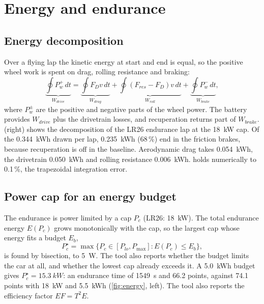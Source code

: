 \documentclass[11pt]{article}
\begin{document}
\section{Energy and endurance}\label{sec:energy}
\subsection{Energy decomposition}
Over a flying lap the kinetic energy at start and end is equal, so the positive wheel work is spent on drag,
rolling resistance and braking:
\begin{equation}
\underbrace{\oint P_w^+\,dt}_{W_{drive}} = \underbrace{\oint F_D v\,dt}_{W_{drag}} + \underbrace{\oint (F_{res}-F_D) v\,dt}_{W_{roll}} + \underbrace{\oint P_w^-\,dt}_{W_{brake}},
\label{eq:balance}
\end{equation}
where $P_w^\pm$ are the positive and negative parts of the wheel power. The battery provides $W_{drive}$ plus the
drivetrain losses, and recuperation returns part of $W_{brake}$.  (right) shows the decomposition
of the LR26 endurance lap at the \SI{18}{kW} cap. Of the \SI{0.344}{kWh} drawn per lap, \SI{0.235}{kWh} (68\,\%)
end in the friction brakes, because recuperation is off in the baseline. Aerodynamic drag takes
\SI{0.054}{kWh}, the drivetrain \SI{0.050}{kWh} and rolling resistance \SI{0.006}{kWh}.  holds
numerically to 0.1\,\%, the trapezoidal integration error.

\subsection{Power cap for an energy budget}
The endurance is power limited by a cap $P_c$ (LR26: \SI{18}{kW}). The total endurance energy $E(P_c)$ grows
monotonically with the cap, so the largest cap whose energy fits a budget $E_b$,
\begin{equation}
P_c^\star = \max\{P_c\in[P_{lo}, P_{\max}] : E(P_c)\le E_b\},
\end{equation}
is found by bisection, to \SI{5}{W}. The tool also reports whether the budget limits the car at all, and whether
the lowest cap already exceeds it. A \SI{5.0}{kWh} budget gives $P_c^\star = \SI{15.3}{kW}$: an endurance time of
\SI{1549}{s} and 66.2 points, against 74.1 points with \SI{18}{kW} and \SI{5.5}{kWh}
(\cref{fig:energy}, left). The tool also reports the efficiency factor $EF = T^2E$.
\end{document}
